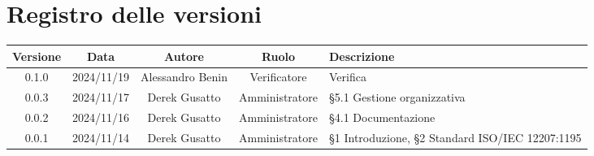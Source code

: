 
\section*{Registro delle versioni}
\begin{table}[H]
    \centering
    \begin{tabular}{|c|c|c|c|p{5cm}|}
        \hline
         \textbf{Versione} &  \textbf{Data} &  \textbf{Autore} &  \textbf{Ruolo} & \textbf{Descrizione} \\
          \hline
           0.1.0& 2024/11/19 & Alessandro Benin & Verificatore & Verifica\\
          \hline
          0.0.3& 2024/11/17 & Derek Gusatto & Amministratore & §5.1 Gestione organizzativa\\
          \hline
          0.0.2& 2024/11/16 & Derek Gusatto & Amministratore & §4.1 Documentazione\\
          \hline
          0.0.1& 2024/11/14 & Derek Gusatto & Amministratore & §1 Introduzione,  §2 Standard ISO/IEC 12207:1195\\
          \hline
    \end{tabular}
\end{table}